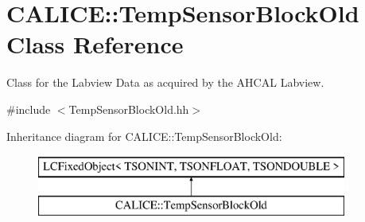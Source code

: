 \section{C\-A\-L\-I\-C\-E\-:\-:Temp\-Sensor\-Block\-Old Class Reference}
\label{classCALICE_1_1TempSensorBlockOld}


Class for the Labview Data as acquired by the A\-H\-C\-A\-L Labview.  




{\ttfamily \#include $<$Temp\-Sensor\-Block\-Old.\-hh$>$}

Inheritance diagram for C\-A\-L\-I\-C\-E\-:\-:Temp\-Sensor\-Block\-Old\-:\begin{figure}[H]
\begin{center}
\leavevmode
\includegraphics[height=2.000000cm]{classCALICE_1_1TempSensorBlockOld}
\end{center}
\end{figure}
